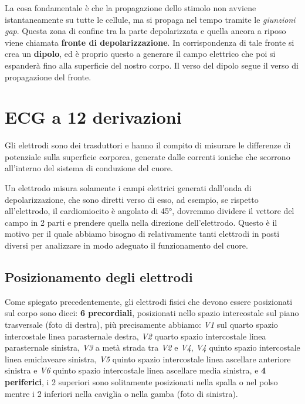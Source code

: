 La cosa fondamentale è che la propagazione dello stimolo non avviene istantaneamente su tutte le cellule, ma si propaga nel tempo tramite le \textit{giunzioni gap}. Questa zona di confine tra la parte depolarizzata e quella ancora a riposo viene chiamata \textbf{fronte di depolarizzazione}. In corrispondenza di tale fronte si crea un \textbf{dipolo}, ed è proprio questo a generare il campo elettrico che poi si espanderà fino alla superficie del nostro corpo. Il verso del dipolo segue il verso di propagazione del fronte.

\section{ECG a 12 derivazioni}
\label{sec_ecg}

Gli elettrodi sono dei trasduttori e hanno il compito di misurare le differenze di potenziale sulla superficie corporea, generate dalle correnti ioniche che scorrono all'interno del sistema di conduzione del cuore. 

Un elettrodo misura solamente i campi elettrici generati dall'onda di depolarizzazione, che sono diretti verso di esso, ad esempio, se rispetto all'elettrodo, il cardiomiocito è angolato di 45°, dovremmo dividere il vettore del campo in 2 parti e prendere quella nella direzione dell'elettrodo. Questo è il motivo per il quale abbiamo bisogno di relativamente tanti elettrodi in posti diversi per analizzare in modo adeguato il funzionamento del cuore.

\subsection{Posizionamento degli elettrodi}
\label{pos_elettrodi}
Come spiegato precedentemente, gli elettrodi fisici che devono essere posizionati sul corpo sono dieci: \textbf{6 precordiali}, posizionati nello spazio intercostale sul piano trasversale (foto di destra), più precisamente abbiamo: \textit{V1} sul quarto spazio intercostale linea parasternale destra, \textit{V2} quarto spazio intercostale linea parasternale sinistra, \textit{V3} a metà strada tra \textit{V2} e \textit{V4}, \textit{V4} quinto spazio intercostale linea emiclaveare sinistra, \textit{V5} quinto spazio intercostale linea ascellare anteriore sinistra e \textit{V6} quinto spazio intercostale linea ascellare media sinistra, e \textbf{4 periferici}, i 2 superiori sono solitamente posizionati nella spalla o nel polso mentre i 2 inferiori nella caviglia o nella gamba (foto di sinistra). 

